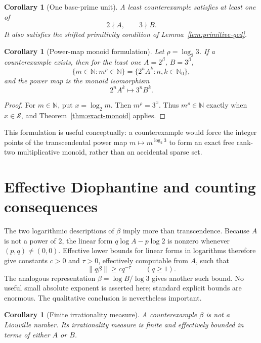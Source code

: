 \documentclass[11pt]{article}
\newtheorem{corollary}[theorem]{Corollary}
\theoremstyle{definition}
\newcommand{\N}{\mathbb N}
\newcommand{\Nzero}{\mathbb N_0}
\begin{document}
\begin{corollary}[One base-prime unit]\label{cor:unit}
A least counterexample satisfies at least one of
\[
  2\nmid A,\qquad 3\nmid B.
\]
It also satisfies the shifted primitivity condition of
Lemma~\ref{lem:primitive-gcd}.
\end{corollary}

\begin{corollary}[Power-map monoid formulation]\label{cor:power-monoid}
Let $\rho=\log_2 3$.  If a counterexample exists, then for the least one
$A=2^\beta$, $B=3^\beta$,
\[
 \{m\in\N:m^\rho\in\N\}=\{2^nA^k:n,k\in\Nzero\},
\]
and the power map is the monoid isomorphism
\[
  2^nA^k\longmapsto3^nB^k.
\]
\end{corollary}
\begin{proof}
For $m\in\N$, put $x=\log_2m$.  Then $m^\rho=3^x$.  Thus
$m^\rho\in\N$ exactly when $x\in\mathcal S$, and
Theorem~\ref{thm:exact-monoid} applies.
\end{proof}

This formulation is useful conceptually: a counterexample would force the
integer points of the transcendental power map $m\mapsto m^{\log_2 3}$ to form
an exact free rank-two multiplicative monoid, rather than an accidental sparse
set.

\section{Effective Diophantine and counting consequences}

The two logarithmic descriptions of $\beta$ imply more than transcendence.
Because $A$ is not a power of $2$, the linear form
$q\log A-p\log2$ is nonzero whenever $(p,q)\ne(0,0)$.  Effective lower bounds
for linear forms in logarithms therefore give constants $c>0$ and $\tau>0$,
effectively computable from $A$, such that
\begin{equation}\label{eq:finite-type}
  \|q\beta\|\ge c q^{-\tau}\qquad(q\ge1).
\end{equation}
The analogous representation $\beta=\log B/\log3$ gives another such bound.
No useful small absolute exponent is asserted here; standard explicit bounds
are enormous.  The qualitative conclusion is nevertheless important.

\begin{corollary}[Finite irrationality measure]\label{cor:finite-mu}
A counterexample $\beta$ is not a Liouville number.  Its irrationality measure
is finite and effectively bounded in terms of either $A$ or $B$.
\end{corollary}
\end{document}
